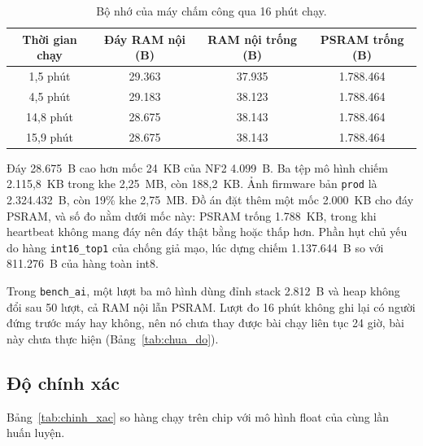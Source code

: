 \documentclass[../DoAn.tex]{subfiles}
\begin{document}
\begin{table}[!htb]
\centering
\small
\caption{Bộ nhớ của máy chấm công qua 16 phút chạy.}
\label{tab:ram_may}
\begin{tabular}{|c|c|c|c|}
\hline
\textbf{Thời gian chạy} & \textbf{Đáy RAM nội (B)} & \textbf{RAM nội trống (B)} & \textbf{PSRAM trống (B)} \\
\hline
1,5 phút & 29.363 & 37.935 & 1.788.464 \\
\hline
4,5 phút & 29.183 & 38.123 & 1.788.464 \\
\hline
14,8 phút & 28.675 & 38.143 & 1.788.464 \\
\hline
15,9 phút & 28.675 & 38.143 & 1.788.464 \\
\hline
\end{tabular}
\end{table}

Đáy 28.675~B cao hơn mốc 24~KB của NF2 4.099~B. Ba tệp mô hình chiếm 2.115,8~KB trong khe 2,25~MB, còn 188,2~KB. Ảnh firmware bản
\texttt{prod} là 2.324.432~B, còn 19\% khe 2,75~MB. Đồ án đặt thêm một mốc 2.000~KB cho đáy PSRAM, và số đo nằm dưới mốc này:
PSRAM trống 1.788~KB, trong khi heartbeat không mang đáy nên đáy thật bằng hoặc thấp hơn. Phần hụt chủ yếu do hàng
\texttt{int16\_top1} của chống giả mạo, lúc dựng chiếm 1.137.644~B so với 811.276~B của hàng toàn int8.

Trong \texttt{bench\_ai}, một lượt ba mô hình dùng đỉnh stack 2.812~B và heap không đổi sau 50 lượt, cả RAM nội lẫn PSRAM. Lượt đo
16 phút không ghi lại có người đứng trước máy hay không, nên nó chưa thay được bài chạy liên tục 24 giờ, bài này chưa thực hiện
(Bảng~\ref{tab:chua_do}).

\subsection{Độ chính xác}
\label{section:5.2.4}

Bảng~\ref{tab:chinh_xac} so hàng chạy trên chip với mô hình float của cùng lần huấn luyện.
\end{document}
